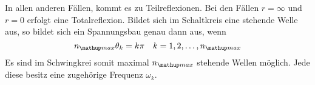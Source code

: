 In allen anderen Fällen, kommt es zu Teilreflexionen.
Bei den Fällen $r=\infty$ und $r=0$ erfolgt eine Totalreflexion.
Bildet sich im Schaltkreis eine stehende Welle aus, so bildet sich ein Spannungsbau genau dann aus, wenn
\begin{equation}
\label{eq:spannungsbauch}
n\ua{max}\theta_k=k\pi \quad k=1,2,\dots,n\ua{max}
\end{equation}
Es sind im Schwingkrei somit maximal $n\ua{max}$ stehende Wellen möglich.
Jede diese besitz eine zugehörige Frequenz $\omega_k$.
